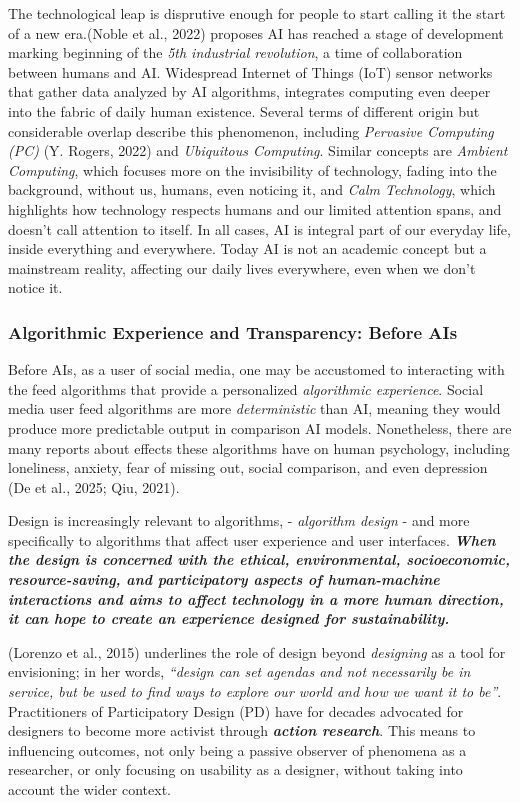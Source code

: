 \documentclass[
  12pt,
  letterpaper,
  DIV=11,
  numbers=noendperiod]{scrartcl}
\begin{document}
The technological leap is disprutive enough for people to start calling
it the start of a new era.(Noble et al., 2022) proposes AI has reached a
stage of development marking beginning of the \emph{5th industrial
revolution}, a time of collaboration between humans and AI. Widespread
Internet of Things (IoT) sensor networks that gather data analyzed by AI
algorithms, integrates computing even deeper into the fabric of daily
human existence. Several terms of different origin but considerable
overlap describe this phenomenon, including \emph{Pervasive Computing
(PC)} (Y. Rogers, 2022) and \emph{Ubiquitous Computing}. Similar
concepts are \emph{Ambient Computing}, which focuses more on the
invisibility of technology, fading into the background, without us,
humans, even noticing it, and \emph{Calm Technology}, which highlights
how technology respects humans and our limited attention spans, and
doesn't call attention to itself. In all cases, AI is integral part of
our everyday life, inside everything and everywhere. Today AI is not an
academic concept but a mainstream reality, affecting our daily lives
everywhere, even when we don't notice it.

\subsubsection{Algorithmic Experience and Transparency: Before
AIs}\label{algorithmic-experience-and-transparency-before-ais}

Before AIs, as a user of social media, one may be accustomed to
interacting with the feed algorithms that provide a personalized
\emph{algorithmic experience}. Social media user feed algorithms are
more \emph{deterministic} than AI, meaning they would produce more
predictable output in comparison AI models. Nonetheless, there are many
reports about effects these algorithms have on human psychology,
including loneliness, anxiety, fear of missing out, social comparison,
and even depression (De et al., 2025; Qiu, 2021).

Design is increasingly relevant to algorithms, - \emph{algorithm design}
- and more specifically to algorithms that affect user experience and
user interfaces. \textbf{\emph{When the design is concerned with the
ethical, environmental, socioeconomic, resource-saving, and
participatory aspects of human-machine interactions and aims to affect
technology in a more human direction, it can hope to create an
experience designed for sustainability.}}

(Lorenzo et al., 2015) underlines the role of design beyond
\emph{designing} as a tool for envisioning; in her words, \emph{``design
can set agendas and not necessarily be in service, but be used to find
ways to explore our world and how we want it to be''}. Practitioners of
Participatory Design (PD) have for decades advocated for designers to
become more activist through \textbf{\emph{action research}}. This means
to influencing outcomes, not only being a passive observer of phenomena
as a researcher, or only focusing on usability as a designer, without
taking into account the wider context.
\end{document}
